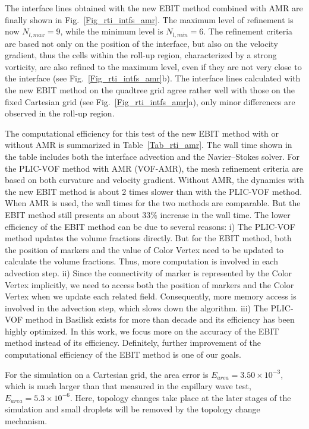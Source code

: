 The interface lines obtained with the new EBIT method combined with AMR are finally shown in Fig.~\ref{Fig_rti_intfs_amr}. The maximum level of refinement is now $N_{l,max}=9$, while the minimum level is $N_{l,min}=6$. The refinement criteria are based not only on the position of the interface, but also on the velocity gradient, thus the cells within the roll-up region, characterized by a strong vorticity, are also refined to the maximum level, even if they are not very close to the interface (see Fig.~\ref{Fig_rti_intfs_amr}b). The interface lines calculated with the new EBIT method on the quadtree grid agree rather well with those on the fixed Cartesian grid (see Fig.~\ref{Fig_rti_intfs_amr}a), only minor differences are observed in the roll-up region.

The computational efficiency for this test of the new EBIT method with or without AMR is summarized in Table~\ref{Tab_rti_amr}. The wall time shown in the table includes both the interface advection and the Navier--Stokes solver. For the PLIC-VOF method with AMR (VOF-AMR), the mesh refinement criteria are based on both curvature and velocity gradient. Without AMR, the dynamics with the new EBIT method is about 2 times slower than with the PLIC-VOF method. 
When AMR is used, the wall times for the two methods are comparable. But the EBIT method still presents an about $33\%$ increase in the wall time. The lower efficiency of the EBIT method can be due to several reasons: i) The PLIC-VOF method updates the volume fractions directly. But for the EBIT method, both the position of markers and the value of Color Vertex need to be updated to calculate the volume fractions. Thus, more computation is involved in each advection step. ii) Since the connectivity of marker is represented by the Color Vertex implicitly, we need to access both the position of markers and the Color Vertex when we update each related field. Consequently, more memory access is involved in the advection step, which slows down the algorithm. iii) The PLIC-VOF method in Basilisk exists for more than decade and its efficiency has been highly optimized. In this work, we focus more on the accuracy of the EBIT method instead of its efficiency. Definitely, further improvement of the computational efficiency of the EBIT method is one of our goals.

For the simulation on a Cartesian grid, the area error is $E_{area} = 3.50 \times 10^{-3}$, which is much larger than that measured in the capillary wave test, $E_{area} = 5.3 \times 10^{-6}$. Here, topology changes take place at the later stages of the simulation and small droplets will be removed by the topology change mechanism.

